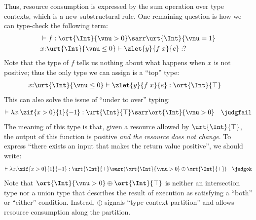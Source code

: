 Thus, resource consumption is expressed by the sum operation over type contexts, which is a new substructural rule.
One remaining question is how we can type-check the following term:
\begin{align*}
  &\vdash f : \ort{\Int}{\vnu > 0} \sarr \urt{\Int}{\vnu = 1}
  \\&x{:}\urt{\Int}{\vnu \leq 0} \vdash \zlet{y}{f\;x}{e} : ?
\end{align*}\noindent
Note that the type of $f$ tells us nothing about what happens when $x$ is not positive; thus the only type we can assign is a ``top'' type:
\begin{align*}
  &x{:}\urt{\Int}{\vnu \leq 0} \vdash \zlet{y}{f\;x}{e} : \ort{\Int}{\top}
\end{align*}\noindent
This can also solve the issue of ``under to over'' typing:
\begin{align*}
  \vdash \lambda x. \zif{x > 0}{1}{-1} : \urt{\Int}{\top} \sarr \ort{\Int}{\vnu > 0}  \quad \judgfail
\end{align*}\noindent
The meaning of this type is that, given a resource allowed by $\urt{\Int}{\top}$, the output of this function is positive \emph{and the resource does not change}. To express ``there exists an input that makes the return value positive'', we should write:
\begin{align*}
  \vdash \lambda x. \zif{x > 0}{1}{-1} : \urt{\Int}{\top} \sarr (\ort{\Int}{\vnu > 0} \oplus \ort{\Int}{\top})  \quad \judgok
\end{align*}\noindent
Note that $\ort{\Int}{\vnu > 0} \oplus \ort{\Int}{\top}$ is neither an intersection type nor a union type that describes the result of execution as satisfying a ``both'' or ``either'' condition. Instead, $\oplus$ signals ``type context partition'' and allows resource consumption along the partition.

